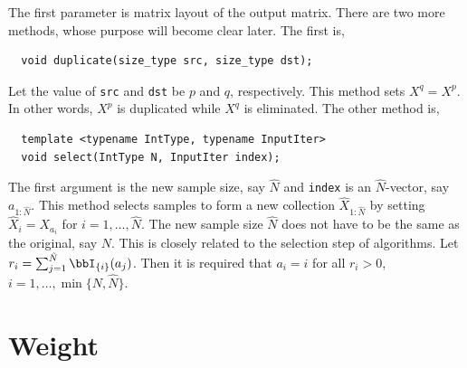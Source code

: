 The first parameter is matrix layout of the output matrix. There are two more
methods, whose purpose will become clear later. The first is,
\begin{Verbatim}
  void duplicate(size_type src, size_type dst);
\end{Verbatim}
Let the value of \verb|src| and \verb|dst| be $p$ and $q$, respectively. This
method sets $X^q = X^p$. In other words, $X^p$ is duplicated while $X^q$ is
eliminated. The other method is,
\begin{Verbatim}
  template <typename IntType, typename InputIter>
  void select(IntType N, InputIter index);
\end{Verbatim}
The first argument is the new sample size, say $\hat{N}$ and \verb|index| is an
$\hat{N}$-vector, say $a_{1:\hat{N}}$. This method selects samples to form a
new collection $\hat{X}_{1:\hat{N}}$  by setting $\hat{X}_i = X_{a_i}$ for $i =
1,\dots,\hat{N}$. The new sample size $\hat{N}$ does not have to be the same as
the original, say $N$. This is closely related to the selection step of \smc
algorithms. Let $r_i = \sum_{j = 1}^{\hat{N}}\bbI_{\{i\}}(a_j)$. Then it is
required that $a_i = i$ for all $r_i > 0$, $i = 1,\dots,\min\{N, \hat{N}\}$.

\section{Weight}
\label{sec:Weight}

